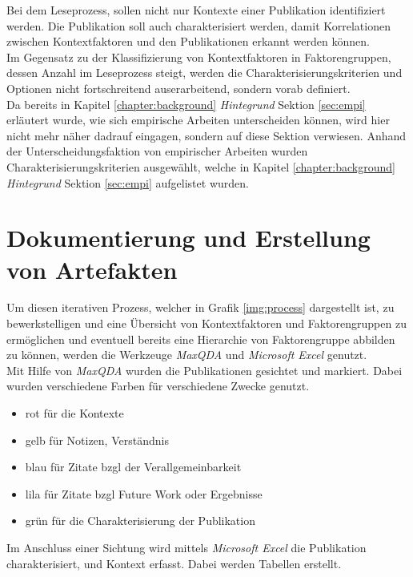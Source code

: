 Bei dem Leseprozess, sollen nicht nur Kontexte einer Publikation identifiziert werden. Die Publikation soll auch charakterisiert werden, damit Korrelationen zwischen Kontextfaktoren und den Publikationen erkannt werden können. \\

Im Gegensatz zu der Klassifizierung von Kontextfaktoren in Faktorengruppen, dessen Anzahl im Leseprozess steigt, werden die Charakterisierungskriterien und Optionen nicht fortschreitend auserarbeitend, sondern vorab definiert. \\
Da bereits in Kapitel \ref{chapter:background} \textit{Hintegrund} Sektion \ref{sec:empi} erläutert wurde, wie sich empirische Arbeiten unterscheiden können, wird hier nicht mehr näher dadrauf eingagen, sondern auf diese Sektion verwiesen. Anhand der Unterscheidungsfaktion von empirischer Arbeiten wurden Charakterisierungskriterien ausgewählt, welche in Kapitel \ref{chapter:background} \textit{Hintegrund} Sektion \ref{sec:empi} aufgelistet wurden. \\


\section{Dokumentierung und Erstellung von Artefakten}
Um diesen iterativen Prozess, welcher in Grafik \ref{img:process} dargestellt ist, zu bewerkstelligen und eine Übersicht von Kontextfaktoren und Faktorengruppen zu ermöglichen und eventuell bereits eine Hierarchie von Faktorengruppe abbilden zu können, werden die Werkzeuge \textit{MaxQDA} und \textit{Microsoft Excel} genutzt. \\

Mit Hilfe von \textit{MaxQDA} wurden die Publikationen gesichtet und markiert. Dabei wurden verschiedene Farben für verschiedene Zwecke genutzt.

\begin{itemize}
    \item rot für die Kontexte
    \item gelb für Notizen, Verständnis
    \item blau für Zitate bzgl der Verallgemeinbarkeit
    \item lila für Zitate bzgl Future Work oder Ergebnisse
    \item grün für die Charakterisierung der Publikation
\end{itemize}

Im Anschluss einer Sichtung wird mittels \textit{Microsoft Excel} die Publikation charakterisiert, und Kontext erfasst. Dabei werden Tabellen erstellt.


